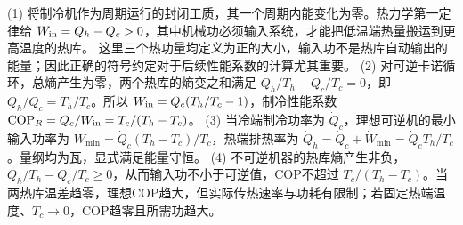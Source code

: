 (1) 将制冷机作为周期运行的封闭工质，其一个周期内能变化为零。热力学第一定律给 \(W_{\rm in}=Q_h-Q_c>0\)，其中机械功必须输入系统，才能把低温端热量搬运到更高温度的热库。 这里三个热功量均定义为正的大小，输入功不是热库自动输出的能量；因此正确的符号约定对于后续性能系数的计算尤其重要。
(2) 对可逆卡诺循环，总熵产生为零，两个热库的熵变之和满足 \(Q_h/T_h-Q_c/T_c=0\)，即 \(Q_h/Q_c=T_h/T_c\)。所以 \(W_{\rm in}=Q_c(T_h/T_c-1)\)，制冷性能系数 \(\mathrm{COP}_R=Q_c/W_{\rm in}=T_c/(T_h-T_c)\)。
(3) 当冷端制冷功率为 \(\dot Q_c\)，理想可逆机的最小输入功率为 \(\dot W_{\min}=\dot Q_c(T_h-T_c)/T_c\)，热端排热率为 \(\dot Q_h=\dot Q_c+\dot W_{\min}=\dot Q_cT_h/T_c\)。量纲均为瓦，显式满足能量守恒。
(4) 不可逆机器的热库熵产生非负，\(Q_h/T_h-Q_c/T_c\ge0\)，从而输入功不小于可逆值，COP不超过 \(T_c/(T_h-T_c)\)。当两热库温差趋零，理想COP趋大，但实际传热速率与功耗有限制；若固定热端温度、\(T_c\to0\)，COP趋零且所需功趋大。
